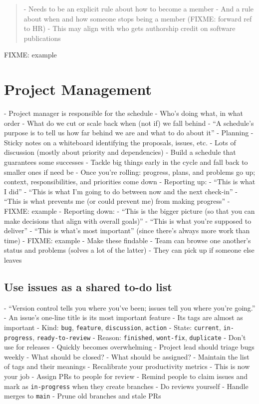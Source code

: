 \documentclass[10pt,letterpaper]{article}
\begin{document}
\begin{quotation}
- Needs to be an explicit rule about how to become a member
  - And a rule about when and how someone stops being a member (FIXME: forward ref to HR)
- This may align with who gets authorship credit on software publications
\end{quotation}

FIXME: example

\section{Project Management}

- Project manager is responsible for the schedule
  - Who's doing what, in what order
  - What do we cut or scale back when (not if) we fall behind
  - ``A schedule's purpose is to tell us how far behind we are and what to do about it''
- Planning
  - Sticky notes on a whiteboard identifying the proposals, issues, etc.
  - Lots of discussion (mostly about priority and dependencies)
- Build a schedule that guarantees some successes
  - Tackle big things early in the cycle and fall back to smaller ones if need be
- Once you're rolling: progress, plans, and problems go up; context, responsibilities, and priorities come down
- Reporting up:
  - ``This is what I did''
  - ``This is what I'm going to do between now and the next check-in''
  - ``This is what prevents me (or could prevent me) from making progress''
  - FIXME: example
- Reporting down:
  - ``This is the bigger picture (so that you can make decisions that align with overall goals)''
  - ``This is what you're supposed to deliver''
  - ``This is what's most important'' (since there's always more work than time)
  - FIXME: example
- Make these findable \cite{Lin2020}
  - Team can browse one another's status and problems (solves a lot of the latter)
  - They can pick up if someone else leaves

\subsection*{Use issues as a shared to-do list}

- ``Version control tells you where you've been; issues tell you where you're going.''
- An issue's one-line title is its most important feature
- Its tags are almost as important
  - Kind: \texttt{bug}, \texttt{feature}, \texttt{discussion}, \texttt{action}
  - State: \texttt{current}, \texttt{in-progress}, \texttt{ready-to-review}
  - Reason: \texttt{finished}, \texttt{wont-fix}, \texttt{duplicate}
- Don't use for releases
  - Quickly becomes overwhelming
- Project lead should triage bugs weekly
  - What should be closed?
  - What should be assigned?
- Maintain the list of tags and their meanings
- Recalibrate your productivity metrics
  - This is now your job
- Assign PRs to people for review
  - Remind people to claim issues and mark as \texttt{in-progress} when they create branches
- Do reviews yourself
- Handle merges to \texttt{main}
- Prune old branches and stale PRs
\end{document}
